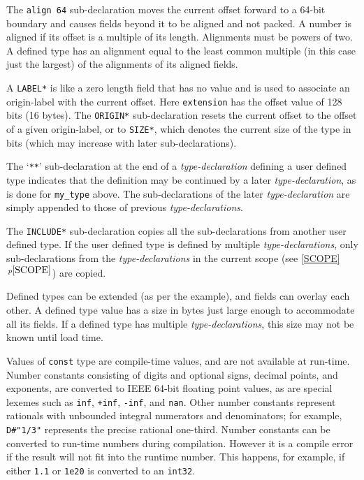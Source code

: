 \documentclass[12pt]{article}
\newcommand{\itemref}[1]{\ref{#1}$\,^{p\pageref{#1}}$}
\begin{document}
The {\tt align 64} sub-declaration moves the current offset
forward to a 64-bit boundary and causes fields beyond it
to be aligned and not packed.  A number is aligned if
its offset is a multiple of its length.  Alignments must be powers of two.
A defined type has an
alignment equal to the least common multiple (in this case just the
largest) of the
alignments of its aligned fields.

A {\tt *LABEL*} is like a zero length field that has no value and
is used to associate an origin-label with the current offset.
Here {\tt extension} has the offset value of 128 bits (16 bytes).
The {\tt *ORIGIN*} sub-declaration resets the current offset to the offset
of a given origin-label, or to {\tt *SIZE*}, which denotes the current
size of the type in bits (which may increase with later sub-declarations).

The `{\tt ***}' sub-declaration at the end of a
{\em type-declaration} defining a user defined type indicates
that the definition may be continued by a later {\em type-declaration},
as is done for {\tt my\_type} above.
The sub-declarations of the later {\em type-declaration} are
simply appended to those of previous {\em type-declarations}.

The {\tt *INCLUDE*} sub-declaration copies all the sub-declarations
from another user defined type.
If the user defined type is
defined by multiple {\em type-declarations}, only sub-declarations
from the {\em type-declarations} in the current scope (see \itemref{SCOPE})
are copied.

Defined types can be extended
(as per the example), and fields can overlay each other.
A defined type value has a size in bytes just large enough to
accommodate all its fields.  If a defined type has multiple
{\em type-declarations}, this size may not be known until load time.

Values of {\tt const} type are compile-time values, and are
not available at run-time.  Number constants consisting of
digits and optional signs, decimal points, and exponents,
are converted to IEEE 64-bit floating point values, as are
special lexemes such as {\tt inf}, {\tt +inf}, {\tt -inf}, and
{\tt nan}.  Other number constants represent
rationals with unbounded integral numerators
and denominators; for example,
{\tt D\#"1/3"} represents the precise rational one-third.
Number constants
can be converted to run-time numbers during compilation.
However it is a compile error
if the result will not fit into the runtime number.
This happens, for example, if either {\tt 1.1} or {\tt 1e20}
is converted to an {\tt int32}.
\end{document}
